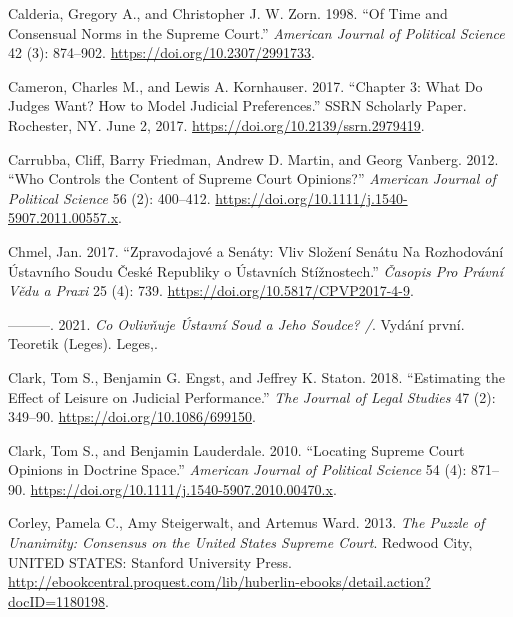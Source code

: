 \documentclass[
  11pt,
]{article}
\newlength{\cslhangindent}
\newenvironment{CSLReferences}[2] %
 {%
  \setlength{\parindent}{0pt}
  \ifodd #1 \everypar{\setlength{\hangindent}{\cslhangindent}}\ignorespaces\fi
  \ifnum #2 > 0
  \setlength{\parskip}{#2\baselineskip}
  \fi
 }%
 {}
\begin{document}
\begin{CSLReferences}{1}{0}
\leavevmode{}%
Calderia, Gregory A., and Christopher J. W. Zorn. 1998. {``Of {Time} and
{Consensual Norms} in the {Supreme Court}.''} \emph{American Journal of
Political Science} 42 (3): 874--902.
\url{https://doi.org/10.2307/2991733}.

\leavevmode{}%
Cameron, Charles M., and Lewis A. Kornhauser. 2017. {``Chapter 3: {What
Do Judges Want}? {How} to {Model Judicial Preferences}.''} SSRN
Scholarly Paper. {Rochester, NY}. June 2, 2017.
\url{https://doi.org/10.2139/ssrn.2979419}.

\leavevmode{}%
Carrubba, Cliff, Barry Friedman, Andrew D. Martin, and Georg Vanberg.
2012. {``Who {Controls} the {Content} of {Supreme Court Opinions}?''}
\emph{American Journal of Political Science} 56 (2): 400--412.
\url{https://doi.org/10.1111/j.1540-5907.2011.00557.x}.

\leavevmode{}%
Chmel, Jan. 2017. {``Zpravodajové a Senáty: {Vliv} Složení Senátu Na
Rozhodování {Ústavního} Soudu {České} Republiky o Ústavních
Stížnostech.''} \emph{Časopis Pro Právní Vědu a Praxi} 25 (4): 739.
\url{https://doi.org/10.5817/CPVP2017-4-9}.

\leavevmode{}%
---------. 2021. \emph{Co Ovlivňuje {Ústavní} Soud a Jeho Soudce? /}.
Vydání první. Teoretik ({Leges}). {Leges,}.

\leavevmode{}%
Clark, Tom S., Benjamin G. Engst, and Jeffrey K. Staton. 2018.
{``Estimating the {Effect} of {Leisure} on {Judicial Performance}.''}
\emph{The Journal of Legal Studies} 47 (2): 349--90.
\url{https://doi.org/10.1086/699150}.

\leavevmode{}%
Clark, Tom S., and Benjamin Lauderdale. 2010. {``Locating {Supreme Court
Opinions} in {Doctrine Space}.''} \emph{American Journal of Political
Science} 54 (4): 871--90.
\url{https://doi.org/10.1111/j.1540-5907.2010.00470.x}.

\leavevmode{}%
Corley, Pamela C., Amy Steigerwalt, and Artemus Ward. 2013. \emph{The
{Puzzle} of {Unanimity}: {Consensus} on the {United States Supreme
Court}}. {Redwood City, UNITED STATES}: {Stanford University Press}.
\url{http://ebookcentral.proquest.com/lib/huberlin-ebooks/detail.action?docID=1180198}.


\end{CSLReferences}
\end{document}
